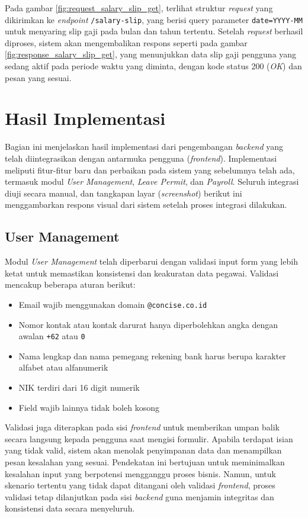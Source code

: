 Pada gambar \ref{fig:request_salary_slip_get}, terlihat struktur \textit{request} yang dikirimkan ke \textit{endpoint} \texttt{/salary-slip}, yang berisi query parameter \texttt{date=YYYY-MM} untuk menyaring slip gaji pada bulan dan tahun tertentu. Setelah \textit{request} berhasil diproses, sistem akan mengembalikan respons seperti pada gambar \ref{fig:response_salary_slip_get}, yang menunjukkan data slip gaji pengguna yang sedang aktif pada periode waktu yang diminta, dengan kode status 200 (\textit{OK}) dan pesan yang sesuai.

\section{Hasil Implementasi}
Bagian ini menjelaskan hasil implementasi dari pengembangan \textit{backend} yang telah diintegrasikan dengan antarmuka pengguna (\textit{frontend}). Implementasi meliputi fitur-fitur baru dan perbaikan pada sistem yang sebelumnya telah ada, termasuk modul \textit{User Management}, \textit{Leave Permit}, dan \textit{Payroll}. Seluruh integrasi diuji secara manual, dan tangkapan layar (\textit{screenshot}) berikut ini menggambarkan respons visual dari sistem setelah proses integrasi dilakukan.

\subsection{User Management}

Modul \textit{User Management} telah diperbarui dengan validasi input form yang lebih ketat untuk memastikan konsistensi dan keakuratan data pegawai. Validasi mencakup beberapa aturan berikut:

\begin{itemize}
    \item Email wajib menggunakan domain \texttt{@concise.co.id}
    \item Nomor kontak atau kontak darurat hanya diperbolehkan angka dengan awalan \texttt{+62} atau \texttt{0}
    \item Nama lengkap dan nama pemegang rekening bank harus berupa karakter alfabet atau alfanumerik
    \item NIK terdiri dari 16 digit numerik
    \item Field wajib lainnya tidak boleh kosong
\end{itemize}
Validasi juga diterapkan pada sisi \textit{frontend} untuk memberikan umpan balik secara langsung kepada pengguna saat mengisi formulir. Apabila terdapat isian yang tidak valid, sistem akan menolak penyimpanan data dan menampilkan pesan kesalahan yang sesuai. Pendekatan ini bertujuan untuk meminimalkan kesalahan input yang berpotensi mengganggu proses bisnis. Namun, untuk skenario tertentu yang tidak dapat ditangani oleh validasi \textit{frontend}, proses validasi tetap dilanjutkan pada sisi \textit{backend} guna menjamin integritas dan konsistensi data secara menyeluruh.


